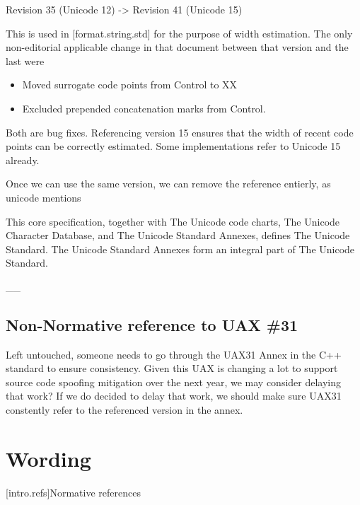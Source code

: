 \documentclass{wg21}
\begin{document}
Revision 35 (Unicode 12) -> Revision 41 (Unicode 15)

This is used in [format.string.std] for the purpose of width estimation.
The only non-editorial applicable change in that document between that version and the last were
\begin{itemize}
\item Moved surrogate code points from Control to XX
\item Excluded prepended concatenation marks from Control.
\end{itemize}

Both are bug fixes.
Referencing version 15 ensures that the width of recent code points can be correctly estimated.
Some implementations refer to Unicode 15 already.

Once we can use the same version, we can remove the reference entierly, as unicode mentions
\begin{quoteblock}
This core specification, together with The Unicode code charts, The Unicode Character Database, and The Unicode Standard Annexes, defines The Unicode Standard.
The Unicode Standard Annexes form an integral part of The Unicode Standard.
\end{quoteblock}__

\subsection{Non-Normative reference to UAX \#31}

Left untouched, someone needs to go through the UAX31 Annex in the C++ standard to ensure consistency.
Given this UAX is changing a lot to support source code spoofing mitigation over the next year, we may consider
delaying that work?
If we do decided to delay that work, we should make sure UAX31 constently refer to the referenced version in the annex.


\section{Wording}

[intro.refs]{Normative references}%
%
\end{document}

